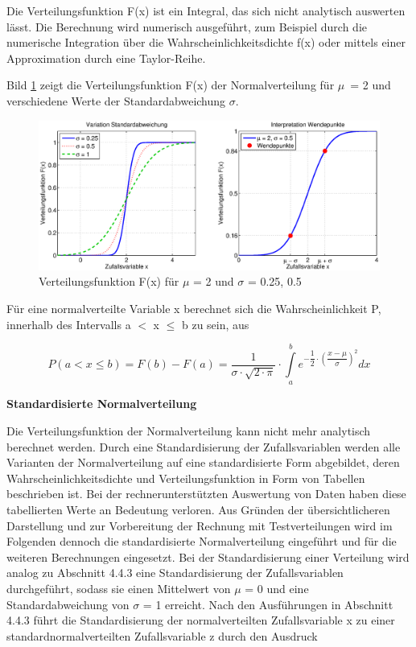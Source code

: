 \noindent Die Verteilungsfunktion F(x) ist ein Integral, das sich nicht analytisch auswerten l\"{a}sst. Die Berechnung wird numerisch ausgef\"{u}hrt, zum Beispiel durch die numerische Integration \"{u}ber die Wahrscheinlichkeitsdichte f(x) oder mittels einer Approximation durch eine Taylor-Reihe.

\noindent Bild \ref{fig:Stetig_Normalverteilung2} zeigt die Verteilungsfunktion F(x) der Normalverteilung f\"{u}r $\mu$~= 2 und verschiedene Werte der Standardabweichung $\sigma$. 

\begin{figure}[H]
  \centerline{\includegraphics[width=1\textwidth]{Kapitel4/Bilder/image35}}
  \caption{Verteilungsfunktion F(x) f\"{u}r $\mu$ = 2 und $\sigma$ = 0.25, 0.5}
  \label{fig:Stetig_Normalverteilung2}
\end{figure}

\noindent F\"{u}r eine normalverteilte Variable x berechnet sich die Wahrscheinlichkeit P, innerhalb des Intervalls a $\mathrm{<}$ x $\leq$ b zu sein, aus 

\begin{equation}\label{eq:fourtwohundrednine}
P\left(a<x\le b\right)=F\left(b\right)-F\left(a\right)=\dfrac{1}{\sigma \cdot \sqrt{2\cdot \pi } } \cdot \int\limits  _{a}^{b}e^{-\dfrac{1}{2} \cdot \left(\dfrac{x-\mu }{\sigma } \right)^{2} }  dx
\end{equation}

\clearpage

{\selectfont
\noindent\textbf{Standardisierte Normalverteilung}}

\noindent Die Verteilungsfunktion der Normalverteilung kann nicht mehr analytisch berechnet werden. Durch eine Standardisierung der Zufallsvariablen werden alle Varianten der Normalverteilung auf eine standardisierte Form abgebildet, deren Wahrscheinlichkeitsdichte und Verteilungsfunktion in Form von Tabellen beschrieben ist. Bei der rechnerunterst\"{u}tzten Auswertung von Daten haben diese tabellierten Werte an Bedeutung verloren. Aus Gr\"{u}nden der \"{u}bersichtlicheren Darstellung und zur Vorbereitung der Rechnung mit Testverteilungen wird im Folgenden dennoch die standardisierte Normalverteilung eingef\"{u}hrt und f\"{u}r die weiteren Berechnungen eingesetzt. Bei der Standardisierung einer Verteilung wird analog zu Abschnitt 4.4.3 eine Standardisierung der Zufallsvariablen durchgef\"{u}hrt, sodass sie einen Mittelwert von $\mu$ = 0 und eine Standardabweichung von $\sigma$ = 1 erreicht. Nach den Ausf\"{u}hrungen in Abschnitt 4.4.3 f\"{u}hrt die Standardisierung der normalverteilten Zufallsvariable x zu einer standardnormalverteilten Zufallsvariable z durch den Ausdruck

